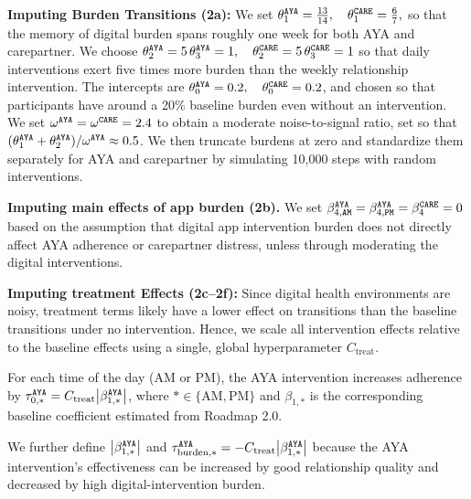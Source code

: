 
\textbf{Imputing Burden Transitions (2a):}
We set $
  \theta_{1}^{\tiny\texttt{AYA}} = \tfrac{13}{14}, \quad \theta_{1}^{\tiny\texttt{CARE}} = \tfrac{6}{7},
$ so that the memory of digital burden spans roughly one week for both AYA and carepartner. We choose
$\theta_{2}^{\tiny\texttt{AYA}} = 5\,\theta_{3}^{\tiny\texttt{AYA}} = 1, 
  \quad
  \theta_{2}^{\tiny\texttt{CARE}} = 5\,\theta_{3}^{\tiny\texttt{CARE}} = 1$ so that daily interventions exert five times more burden than the weekly relationship intervention. The intercepts are $
  \theta_{0}^{\tiny\texttt{AYA}} = 0.2, 
  \quad
  \theta_{0}^{\tiny\texttt{CARE}} = 0.2$, and chosen so that participants have around a 20\% baseline burden even without an intervention. We set
$
  \omega^{\tiny\texttt{AYA}} = \omega^{\tiny\texttt{CARE}} = 2.4
$ to obtain a moderate noise-to-signal ratio, set so that 
\(
    (\theta_{1}^{\tiny\texttt{AYA}} + \theta_{2}^{\tiny\texttt{AYA}}) / \omega^{\tiny\texttt{AYA}} 
    \approx 0.5
\).
We then truncate burdens at zero and standardize them separately for AYA and carepartner by simulating 10,000 steps with random interventions.

\textbf{Imputing main effects of app burden (2b).} We set $\beta_{4, {\texttt{AM}}}^{\tiny\texttt{AYA}} = \beta_{4, {\texttt{PM}}}^{\tiny\texttt{AYA}} = \beta_{4}^{\tiny\texttt{CARE}} = 0$ based on the assumption that digital app intervention burden does not directly affect AYA adherence or carepartner distress, unless through moderating the digital interventions.

\textbf{Imputing treatment Effects (2c--2f):}
Since digital health environments are noisy, treatment terms likely have a lower effect on transitions than the baseline transitions under no intervention. Hence, we scale all intervention effects relative to the baseline effects using a single, global hyperparameter $C_{\text{treat}}$. 

For each time of the day (AM or PM), the AYA intervention increases adherence by $\tau_{0, *}^{\tiny\texttt{AYA}} = C_{\text{treat}} \bigl|\beta_{1, *}^{\tiny\texttt{AYA}}\bigr|$, where $* \in \{\mathrm{AM}, \mathrm{PM}\}$ and $\beta_{1, *}$ is the corresponding baseline coefficient estimated from Roadmap 2.0. 

We further define $\bigl|\beta_{1, *}^{\tiny\texttt{AYA}}\bigr|$ and $\tau_{\text{burden}, *}^{\tiny\texttt{AYA}} = -C_{\text{treat}} \bigl|\beta_{1, *}^{\tiny\texttt{AYA}}\bigr|$ because the AYA intervention's effectiveness can be increased by good relationship quality and decreased by high digital-intervention burden.

